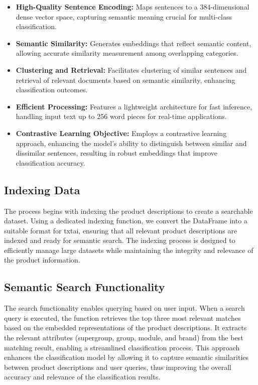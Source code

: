 \documentclass[9pt,a4paper,twoside]{rho-class/rho}
\begin{document}
    \begin{itemize}
        \item \textbf{High-Quality Sentence Encoding:} Maps sentences to a 384-dimensional dense vector space, capturing semantic meaning crucial for multi-class classification.
        \item \textbf{Semantic Similarity:} Generates embeddings that reflect semantic content, allowing accurate similarity measurement among overlapping categories.
        \item \textbf{Clustering and Retrieval:} Facilitates clustering of similar sentences and retrieval of relevant documents based on semantic similarity, enhancing classification outcomes.
        \item \textbf{Efficient Processing:} Features a lightweight architecture for fast inference, handling input text up to 256 word pieces for real-time applications.
        \item \textbf{Contrastive Learning Objective:} Employs a contrastive learning approach, enhancing the model's ability to distinguish between similar and dissimilar sentences, resulting in robust embeddings that improve classification accuracy.
    \end{itemize}
    
    \subsection{Indexing Data}
    The process begins with indexing the product descriptions to create a searchable dataset. Using a dedicated indexing function, we convert the DataFrame into a suitable format for txtai, ensuring that all relevant product descriptions are indexed and ready for semantic search. The indexing process is designed to efficiently manage large datasets while maintaining the integrity and relevance of the product information.
    
    \subsection{Semantic Search Functionality}
    The search functionality enables querying based on user input. When a search query is executed, the function retrieves the top three most relevant matches based on the embedded representations of the product descriptions. It extracts the relevant attributes (supergroup, group, module, and brand) from the best matching result, enabling a streamlined classification process. This approach enhances the classification model by allowing it to capture semantic similarities between product descriptions and user queries, thus improving the overall accuracy and relevance of the classification results.
    
\end{document}
